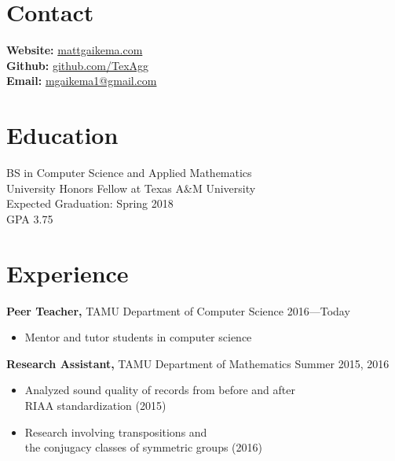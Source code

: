\documentclass[margin]{res}
\begin{document}
 
 
 
\noindent\makebox[\linewidth]{\rule{\paperwidth}{0.4pt}}
 
\address{{\bf Current Address} \\ 101 Church Avenue, appt. 222 \\ College Station, TX 77840}
\address{{\bf Permanent Address} \\ 22619 Arbor Stream Dr. \\ Katy, TX 77450}

 
\begin{resume} 
 
\section{Contact} 
\textbf{Website: }\href{www.mattgaikema.com}{mattgaikema.com} \\
\textbf{Github: }\href{https://github.com/TexAgg}{github.com/TexAgg} \\
\textbf{Email: }\href{mailto:mgaikema1@gmail.com}{mgaikema1@gmail.com}


\section{Education} 
BS in Computer Science and Applied Mathematics \\
University Honors Fellow at Texas A\&M University \\
Expected Graduation: Spring 2018 \\ 
GPA 3.75


\section{Experience}
{\bf Peer Teacher,} TAMU Department of Computer Science \hfill 2016---Today
\begin{itemize} \itemsep -2pt
    \item Mentor and tutor students in computer science
\end{itemize}

{\bf Research Assistant,} TAMU Department of Mathematics \hfill Summer 2015, 2016
\begin{itemize} \itemsep -2pt  %
    \item Analyzed sound quality of records from before and after \\ 
    RIAA standardization (2015)
    \item Research involving transpositions and \\
    the conjugacy classes of symmetric groups (2016)
\end{itemize}


\end{resume}
\end{document}
